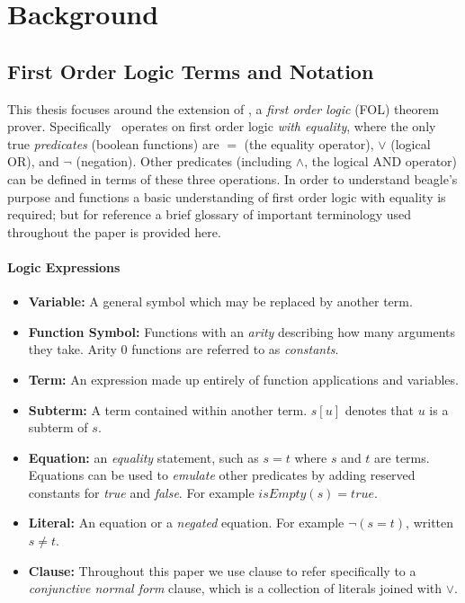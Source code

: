 
\chapter{Background}
\label{cha:background}

\section{First Order Logic Terms and Notation}
\label{sec:terminology}

This thesis focuses around the extension of \beagle, a \emph{first order logic} (FOL) theorem prover.
Specifically \beagle\ operates on first order logic \emph{with equality}, where the only
true \emph{predicates} (boolean functions) are $=$ (the equality operator), $\lor$ (logical OR),  and
$\lnot$ (negation). Other predicates (including $\land$, the logical AND operator) can be defined
in terms of these three operations.
In order to understand beagle's purpose and functions a basic understanding of first order logic
with equality is required; but for reference a brief glossary of important terminology used throughout the paper
is provided here.

\subsubsection{Logic Expressions}

\begin{itemize}
\item \textbf{Variable:} A general symbol which may be replaced by another term.
\item \textbf{Function Symbol:} Functions with an \emph{arity} describing how many
arguments they take. Arity 0 functions are referred to as \emph{constants}.
\item \textbf{Term:} An expression made up entirely of function applications and variables.
\item \textbf{Subterm:} A term contained within another term. $s[u]$ denotes that
$u$ is a subterm of $s$.
\item \textbf{Equation:} an \emph{equality} statement, such as $s = t$ where $s$
and $t$ are terms. Equations can be used to \emph{emulate} other predicates
by adding reserved constants for \emph{true} and \emph{false}. For example $isEmpty(s) = true$.
\item \textbf{Literal:} An equation or a \emph{negated} equation. For example $\lnot (s = t)$,
written $s \neq t$.
\item \textbf{Clause:} Throughout this paper we use clause to refer specifically to a \emph{conjunctive normal form} clause,
which is a collection of literals joined with $\lor$.
\end{itemize}

